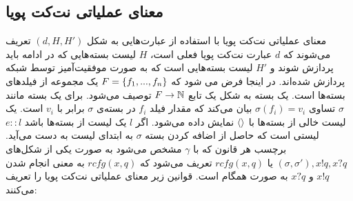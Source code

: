 \subsection{معنای عملیاتی نت‌کت پویا}
معنای عملیاتی%
نت‌کت پویا با استفاده از عبارت‌هایی به شکل
$(d,H,H')$
تعریف می‌شوند که
$d$
عبارت نت‌کت‌ پویا فعلی است،
$H$
لیست بسته‌هایی که در ادامه باید پردازش شوند
و
$H'$
لیست بسته‌هایی است که به صورت موفقیت‌آمیز توسط شبکه پردازش شده‌اند.
در اینجا فرض می شود که
$F = \{f_1,...,f_n\}$
یک مجموعه از فیلد‌های بسته‌ها است.
یک بسته به شکل یک تابع
$F \rightarrow \mathbb{N}$
توصیف می‌شود.
برای یک بسته مانند
$\sigma$
تساوی
$\sigma(f_i) = v_i$
بیان می‌کند که مقدار فیلد
$f_i$
در بسته‌ی
$\sigma$
برابر با
$v_i$
است.
یک لیست خالی از بسته‌ها با
$\langle  \rangle$
نمایش داده می‌شود.
اگر
$l$
یک لیست از بسته‌ها باشد
$e::l$
لیستی است که حاصل از اضافه کردن بسته
$\sigma$
به ابتدای لیست به دست می‌آید.
برچسب هر قانون که با
$\gamma$
مشخص می‌شود به صورت یکی از شکل‌های
$(\sigma,\sigma'),x!q,x?q$
یا
$rcfg(x,q)$
تعریف می‌شود
که
$rcfg(x,q)$
به معنی انجام شدن
$x!q$
و
$x?q$
به صورت همگام%
است.
قوانین زیر معنای عملیاتی نت‌کت پویا را تعریف می‌کنند:
